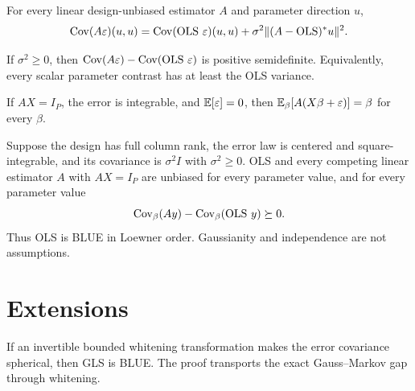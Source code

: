 \begin{theorem}\label{thm:gm-gap}
For every linear design-unbiased estimator $A$ and parameter direction $u$,
\[
 \operatorname{Cov}(A\varepsilon)(u,u)
 = \operatorname{Cov}(\operatorname{OLS}\,\varepsilon)(u,u)
   + \sigma^2\lVert(A-\operatorname{OLS})^*u\rVert^2.
\]
\leanok
\end{theorem}

\begin{theorem}\label{thm:gm-blue}
If $\sigma^2\geq0$, then $\operatorname{Cov}(A\varepsilon)-\operatorname{Cov}(\operatorname{OLS}\,\varepsilon)$ is positive semidefinite.
Equivalently, every scalar parameter contrast has at least the OLS variance.
\leanok
\end{theorem}

\begin{lemma}\label{lem:expectation-bridge}
If $AX=I_P$, the error is integrable, and $\mathbb{E}[\varepsilon]=0$, then
$\mathbb{E}_\beta[A(X\beta+\varepsilon)]=\beta$ for every $\beta$.
\leanok
\end{lemma}

\begin{theorem}\label{thm:gm-audited}
Suppose the design has full column rank, the error law is centered and square-integrable, and its
covariance is $\sigma^2 I$ with $\sigma^2\geq0$.  OLS and every competing linear estimator $A$
with $AX=I_P$ are unbiased for every parameter value, and for every parameter value
\[
 \operatorname{Cov}_\beta(Ay)-\operatorname{Cov}_\beta(\operatorname{OLS}\,y)\succeq0.
\]
Thus OLS is BLUE in Loewner order.  Gaussianity and independence are not assumptions.
\leanok
\end{theorem}

\chapter{Extensions}

\begin{theorem}\label{thm:aitken}
If an invertible bounded whitening transformation makes the error covariance spherical, then GLS
is BLUE.  The proof transports the exact Gauss--Markov gap through whitening.
\leanok
\end{theorem}

